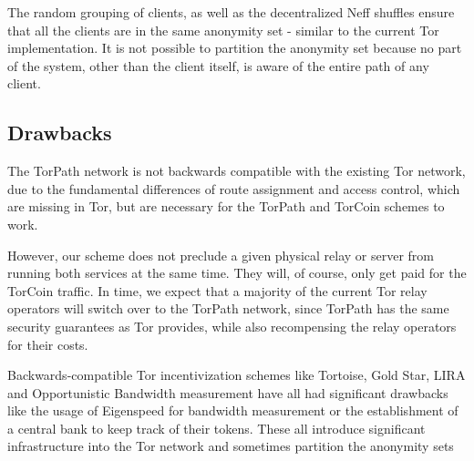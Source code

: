 The random grouping of clients, as well as the decentralized Neff shuffles ensure that all the clients are in the same anonymity set - similar to the current Tor implementation. It is not possible to partition the anonymity set because no part of the system, other than the client itself, is aware of the entire path of any client.

\subsection{Drawbacks}
The TorPath network is not backwards compatible with the existing Tor network, due to the fundamental differences of route assignment and access control, which are missing in Tor, but are necessary for the TorPath and TorCoin schemes to work.

However, our scheme does not preclude a given physical relay or server from running both services at the same time. They will, of course, only get paid for the TorCoin traffic. In time, we expect that a majority of the current Tor relay operators will switch over to the TorPath network, since TorPath has the same security guarantees as Tor provides, while also recompensing the relay operators for their costs.

Backwards-compatible Tor incentivization schemes like Tortoise\cite{acsac11-tortoise}, Gold Star\cite{incentives-fc10}, LIRA and Opportunistic Bandwidth measurement have all had significant drawbacks like the usage of Eigenspeed for bandwidth measurement or the establishment of a central bank to keep track of their tokens. These all introduce significant infrastructure into the Tor network and sometimes partition the anonymity sets